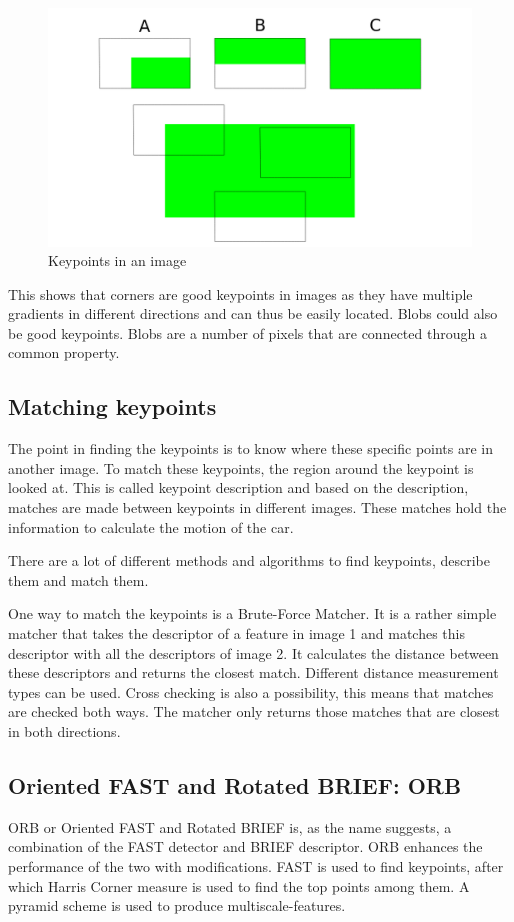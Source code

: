 \begin{figure}
    \centering
    \includegraphics[width=1\textwidth]{figures/features.png}
    \caption{Keypoints in an image}
    \label{fig:features}
\end{figure}

This shows that corners are good keypoints in images as they have multiple gradients in different directions and can thus be easily located. Blobs could also be good keypoints. Blobs are a number of pixels that are connected through a common property.

\subsection{Matching keypoints}
The point in finding the keypoints is to know where these specific points are in another image. To match these keypoints, the region around the keypoint is looked at. This is called keypoint description and based on the description, matches are made between keypoints in different images. These matches hold the information to calculate the motion of the car.\bigskip

There are a lot of different methods and algorithms to find keypoints, describe them and match them.\bigskip

One way to match the keypoints is a Brute-Force Matcher. It is a rather simple matcher that takes the descriptor of a feature in image 1 and matches this descriptor with all the descriptors of image 2. It calculates the distance between these descriptors and returns the closest match. Different distance measurement types can be used. Cross checking is also a possibility, this means that matches are checked both ways. The matcher only returns those matches that are closest in both directions.

\subsection{Oriented FAST and Rotated BRIEF: ORB}
ORB or Oriented FAST and Rotated BRIEF is, as the name suggests, a combination of the FAST detector and BRIEF descriptor. ORB enhances the performance of the two with modifications. FAST is used to find keypoints, after which Harris Corner measure is used to find the top points among them. A pyramid scheme is used to produce multiscale-features. \bigskip 


